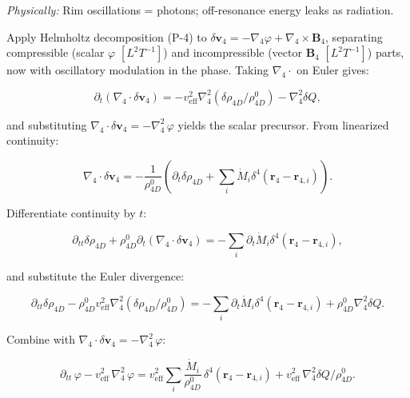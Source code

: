 \textit{Physically:} Rim oscillations = photons; off-resonance energy leaks as radiation.

Apply Helmholtz decomposition (P-4) to $\delta \mathbf{v}_4 = -\nabla_4 \varphi + \nabla_4 \times \mathbf{B}_4$, separating compressible (scalar $\varphi$ $[L^2 T^{-1}]$) and incompressible (vector $\mathbf{B}_4$ $[L^2 T^{-1}]$) parts, now with oscillatory modulation in the phase. Taking $\nabla_4 \cdot$ on Euler gives:

\begin{equation}
\partial_t (\nabla_4 \cdot \delta \mathbf{v}_4) = -v_{\text{eff}}^2 \nabla_4^2 (\delta \rho_{4D} / \rho_{4D}^0) - \nabla_4^2 \delta Q,
\end{equation}

and substituting $\nabla_4 \cdot \delta \mathbf{v}_4 = -\nabla_4^2 \,\varphi$ yields the scalar precursor. From linearized continuity:

\begin{equation}
\nabla_4 \cdot \delta \mathbf{v}_4 = -\frac{1}{\rho_{4D}^0} \left( \partial_t \delta \rho_{4D} + \sum_i \dot{M}_i \delta^4(\mathbf{r}_4 - \mathbf{r}_{4,i}) \right).
\end{equation}

Differentiate continuity by $t$:

\begin{equation}
\partial_{tt} \delta \rho_{4D} + \rho_{4D}^0 \partial_t (\nabla_4 \cdot \delta \mathbf{v}_4) = -\sum_i \partial_t \dot{M}_i \delta^4(\mathbf{r}_4 - \mathbf{r}_{4,i}),
\end{equation}

and substitute the Euler divergence:

\begin{equation}
\partial_{tt} \delta \rho_{4D} - \rho_{4D}^0 v_{\text{eff}}^2 \nabla_4^2 (\delta \rho_{4D} / \rho_{4D}^0) = -\sum_i \partial_t \dot{M}_i \delta^4(\mathbf{r}_4 - \mathbf{r}_{4,i}) + \rho_{4D}^0 \nabla_4^2 \delta Q.
\end{equation}

Combine with $\nabla_4 \cdot \delta \mathbf{v}_4 = -\nabla_4^2 \,\varphi$:

\begin{equation}
\partial_{tt} \,\varphi - v_{\text{eff}}^2 \,\nabla_4^2 \,\varphi = v_{\text{eff}}^2 \sum_i \frac{\dot{M}_i}{\rho_{4D}^0} \,\delta^4(\mathbf{r}_4 - \mathbf{r}_{4,i}) + v_{\text{eff}}^2 \,\nabla_4^2 \delta Q / \rho_{4D}^0.
\end{equation}

